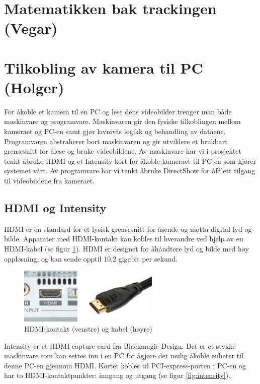 \section{Matematikken bak trackingen (Vegar)}

	

\section{Tilkobling av kamera til PC (Holger)}

	For \aa \space koble et kamera til en PC og lese dens videobilder trenger man b\aa de maskinvare og programvare. Maskinvaren gir den fysiske tilkoblingen mellom kameraet og PC-en samt gj\o r lavniv\aa s logikk og behandling av dataene. Programvaren abstraherer bort maskinvaren og gir utviklere et brukbart grensesnitt for \aa \space lese og bruke videobildene. Av maskinvare har vi i prosjektet tenkt \aa \space bruke HDMI og et Intensity-kort for \aa \space koble kameraet til PC-en som kj\o rer systemet v\aa rt. Av programvare har vi tenkt \aa \space bruke DirectShow for \aa \space f\aa \space lett tilgang til videobildene fra kameraet.
	
	\subsection{HDMI og Intensity}
	
		HDMI er en standard for et fysisk grensesnitt for \aa \space sende og motta digital lyd og bilde. Apparater med HDMI-kontakt kan kobles til hverandre ved hjelp av en HDMI-kabel (se figur \ref{fig:hdmi}). HDMI er designet for \aa \space h\aa ndtere lyd og bilde med h\o y oppl\o sning, og kan sende opptil 10,2 gigabit per sekund.
		
		\begin{figure}[h]
		\centering
		\includegraphics[width=0.60\textwidth]{graphics/hdmi.png}
		\caption{HDMI-kontakt (venstre) og kabel (h\o yre)}
		\label{fig:hdmi}
		\end{figure}
		
		Intensity er et HDMI capture card fra Blackmagic Design. Det er et stykke maskinvare som kan settes inn i en PC for \aa \space gj\o re det mulig \aa \space koble enheter til denne PC-en gjennom HDMI. Kortet kobles til PCI-express-porten i PC-en og har to HDMI-kontaktpunkter: inngang og utgang (se figur \ref{fig:intensity}).
		
